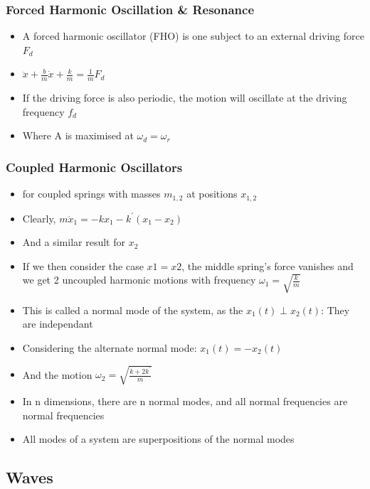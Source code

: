 \documentclass{article}
\begin{document}
\begin{itemize}
\end{itemize}

\subsubsection*{Forced Harmonic Oscillation \& Resonance}

\begin{itemize}
    \item A forced harmonic oscillator (FHO) is one subject to an external driving force \(F_d\)
    \item \(\ddot x + \frac{b}{m}\dot x + \frac{k}{m}=\frac{1}{m}F_d\)
    \item If the driving force is also periodic, the motion will oscillate at the driving frequency \(f_d\)
    \item Where A is maximised at \(\omega_d=\omega_r\)
\end{itemize}

\subsubsection*{Coupled Harmonic Oscillators}
\begin{itemize}
    \item for coupled springs with masses \(m_{1,2}\) at positions \(x_{1,2}\)
    \item Clearly, \(m\ddot x_1 =-kx_1 -k^{\prime}(x_1-x_2)\)
    \item And a similar result for \(x_2\)
    \item If we then consider the case \(x1=x2\), the middle spring's force vanishes and we get 2 uncoupled harmonic motions with frequency \(\omega_1=\sqrt{\frac{k}{m}}\)
    \item This is called a normal mode of the system, as the \(x_1(t)\perp x_2(t)\): They are independant  
    \item Considering the alternate normal mode: \(x_1(t)=-x_2(t)\)
    \item And the motion \(\omega_2=\sqrt{\frac{k+2k^{\prime}}{m}}\)
    \item In n dimensions, there are n normal modes, and all normal frequencies are normal frequencies
    \item All modes of a system are superpositions of the normal modes
\end{itemize}

\newpage
\subsection*{Waves}
\end{document}
